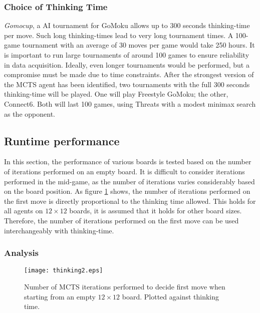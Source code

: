 \subsubsection{Choice of Thinking Time}
\textit{Gomocup}, a AI tournament for {GoMoku} allows up to 300 seconds thinking-time per 
move. Such long thinking-times lead to very long tournament times. 
A 100-game tournament with an average of 30 moves per game would take 250 hours. It 
is important to run large tournaments of around 100 games to ensure reliability in data 
acquisition. Ideally, even longer tournaments would be performed, but a compromise must be made due to time constraints.
After the strongest version of the {MCTS} agent has been 
identified, two tournaments with the full 300 seconds thinking-time will be played. One will play {Freestyle GoMoku}; the other, {Connect6}. Both will last 100 games, using {Threats} with a modest {minimax} search as the opponent.

\subsection{Runtime performance}
In this section, the performance of various boards is tested based on the number of iterations performed on an empty board. It is difficult to consider iterations performed in the mid-game, as the number of iterations varies considerably based on the board position. As figure \ref{fig:linear} shows, the number of iterations performed on the first move is directly proportional to the thinking time allowed. This holds for all agents on $12 \times 12$ boards, it is assumed that it holds for other board sizes. Therefore, the number of iterations performed on the first move can be used interchangeably with thinking-time.

\subsubsection{Analysis}

\begin{figure}
\centering
{\texttt{[image: thinking2.eps]}}
\caption{Number of {MCTS} iterations performed to decide first move when starting from an empty $12\times 12$ board. Plotted against thinking time.}
\label{fig:linear}
\end{figure}

